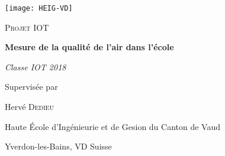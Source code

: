 \begin{titlepage}
	\centering
	\texttt{[image: HEIG-VD]}\par\vspace{2cm}
	{\scshape\Large Projet IOT\par}
	\vspace{1.5cm}
	{\huge\bfseries Mesure de la qualité de l'air dans l'école\par}
	\vspace{2cm}
	{\Large\itshape Classe IOT 2018\par}
    \vspace{2cm}
	{\large Supervisée par\par
	Hervé \textsc{Dedieu}}
	\vfill
	Haute École d'Ingénieurie et de Gesion du Canton de Vaud\par
    Yverdon-les-Bains, VD Suisse\par
\end{titlepage}
\blankpage
